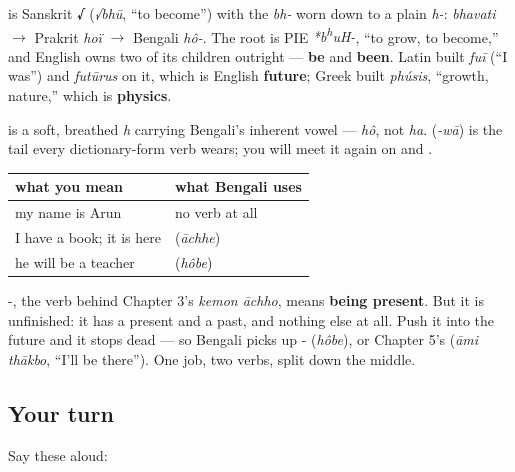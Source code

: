 \begin{cousinweb}
\textbf{} is Sanskrit \textbf{√} (\emph{√bhū}, \textquotedblleft{}to become\textquotedblright{}) with the \emph{bh-} worn down to a plain \emph{h-}: \emph{bhavati} $\to$ Prakrit \emph{hoï} $\to$ Bengali \emph{hô-}. The root is PIE \emph{*b\textsuperscript{h}uH-}, \textquotedblleft{}to grow, to become,\textquotedblright{} and English owns two of its children outright — \textbf{be} and \textbf{been}. Latin built \emph{fuī} (\textquotedblleft{}I was\textquotedblright{}) and \emph{futūrus} on it, which is English \textbf{future}; Greek built \emph{phúsis}, \textquotedblleft{}growth, nature,\textquotedblright{} which is \textbf{physics}.
\end{cousinweb}

\begin{sounds}
\textbf{} is a soft, breathed \emph{h} carrying Bengali's inherent vowel — \emph{hô}, not \emph{ha}. \textbf{} (\emph{-wā}) is the tail every dictionary-form verb wears; you will meet it again on  and .
\end{sounds}

\begin{grammarlens}[title={Grammar Lens: two be-verbs, and one of them is unfinished}]
\noindent
\begin{tabularx}{\linewidth}{@{}>{\raggedright\arraybackslash}X>{\raggedright\arraybackslash}X@{}}
\toprule
\textbf{what you mean} & \textbf{what Bengali uses} \\
\midrule
my name is Arun & no verb at all \\
I have a book; it is here & \textbf{\bn{আছে}} (\emph{āchhe}) \\
he will be a teacher & \textbf{\bn{হবে}} (\emph{hôbe}) \\
\bottomrule
\end{tabularx}

-, the verb behind Chapter 3's \emph{kemon āchho}, means \textbf{being present}. But it is unfinished: it has a present and a past, and nothing else at all. Push it into the future and it stops dead — so Bengali picks up - (\emph{hôbe}), or Chapter 5's  (\emph{āmi thākbo}, \textquotedblleft{}I'll be there\textquotedblright{}). One job, two verbs, split down the middle.
\end{grammarlens}

\subsection*{Your turn}
Say these aloud:

